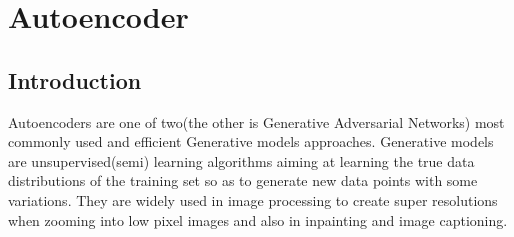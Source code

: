 \chapter{ Autoencoder }
\section{ Introduction }
Autoencoders are one of two(the other is Generative Adversarial Networks) most commonly used and efficient Generative models approaches. Generative models are unsupervised(semi) learning algorithms aiming at learning the true data distributions of the training set so as to generate new data points with some variations. They are widely used in image processing to create super resolutions when zooming into low pixel images and also in inpainting and image captioning.

